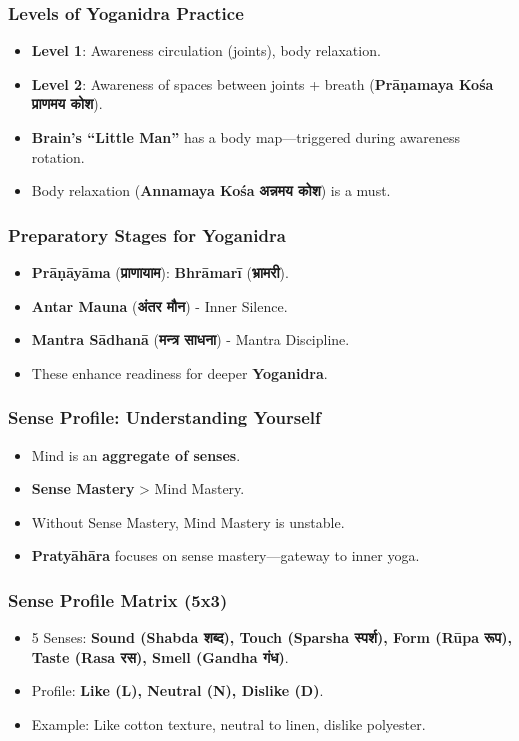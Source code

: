 \begin{frame}[fragile]\frametitle{Levels of Yoganidra Practice}
      \begin{itemize}
      \item \textbf{Level 1}: Awareness circulation (joints), body relaxation.
      \item \textbf{Level 2}: Awareness of spaces between joints + breath (\textbf{Prāṇamaya Kośa} \textbf{प्राणमय कोश}).
      \item \textbf{Brain’s “Little Man”} has a body map—triggered during awareness rotation.
      \item Body relaxation (\textbf{Annamaya Kośa} \textbf{अन्नमय कोश}) is a must.
      \end{itemize}
\end{frame}

\begin{frame}[fragile]\frametitle{Preparatory Stages for Yoganidra}
      \begin{itemize}
      \item \textbf{Prāṇāyāma} (\textbf{प्राणायाम}): \textbf{Bhrāmarī} (\textbf{भ्रामरी}).
      \item \textbf{Antar Mauna} (\textbf{अंतर मौन}) - Inner Silence.
      \item \textbf{Mantra Sādhanā} (\textbf{मन्त्र साधना}) - Mantra Discipline.
      \item These enhance readiness for deeper \textbf{Yoganidra}.
      \end{itemize}
\end{frame}

\begin{frame}[fragile]\frametitle{Sense Profile: Understanding Yourself}
      \begin{itemize}
      \item Mind is an \textbf{aggregate of senses}.
      \item \textbf{Sense Mastery} > Mind Mastery.
      \item Without Sense Mastery, Mind Mastery is unstable.
      \item \textbf{Pratyāhāra} focuses on sense mastery—gateway to inner yoga.
      \end{itemize}
\end{frame}

\begin{frame}[fragile]\frametitle{Sense Profile Matrix (5x3)}
      \begin{itemize}
      \item 5 Senses: \textbf{Sound (Shabda \textbf{शब्द}), Touch (Sparsha \textbf{स्पर्श}), Form (Rūpa \textbf{रूप}), Taste (Rasa \textbf{रस}), Smell (Gandha \textbf{गंध})}.
      \item Profile: \textbf{Like (L), Neutral (N), Dislike (D)}.
      \item Example: Like cotton texture, neutral to linen, dislike polyester.
      \end{itemize}
\end{frame}


